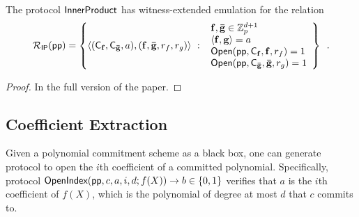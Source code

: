 \begin{lemma}
    The protocol $\textsf{{InnerProduct}}$ has witness-extended emulation for the relation
\[\mathcal{R}_\mathsf{IP}(\textsf{pp}) = \left\{
    \langle(\mathsf{C}_\mathbf{f}, \mathsf{C}_\mathbf{\bar{g}}, a), (\mathbf{f}, \mathbf{\bar{g}}, r_f, r_g)\rangle \ : \     \begin{array}{l}
            \mathbf{f}, \mathbf{\bar{g}} \in \mathbb{Z}_p^{d+1} \\
            \langle \mathbf{f}, \mathbf{g} \rangle = a \\
            \textsf{{Open}}(\textsf{pp}, \mathsf{C}_\mathbf{f}, \mathbf{f}, r_f) = 1 \\
            \textsf{{Open}}(\textsf{pp}, \mathsf{C}_\mathbf{\bar{g}}, \mathbf{\bar{g}}, r_g) = 1
        \end{array}
    \right\} \enspace .
\]
\end{lemma}

\begin{proof}
In the full version of the paper.
\end{proof}
\fi 

\subsection{Coefficient Extraction} \label{section:generic_coefficient_extraction}

Given a polynomial commitment scheme as a black box, one can generate protocol to open the $i$th coefficient of a committed polynomial. Specifically, protocol $\textsf{{OpenIndex}}(\textsf{pp}, c, a, i, d; f(X)) \rightarrow b \in \{0,1\}$ verifies that $a$ is the $i$th coefficient of $f(X)$, which is the polynomial of degree at most $d$ that $c$ commits to.

